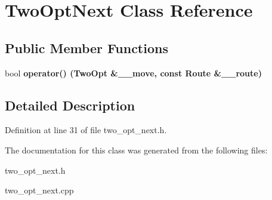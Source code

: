 \section{Two\-Opt\-Next Class Reference}
\label{class_two_opt_next}
\subsection*{Public Member Functions}
\begin{CompactItemize}
\item 
bool \bf{operator()} (\bf{Two\-Opt} \&\_\-\_\-move, const Route \&\_\-\_\-route)\label{class_two_opt_next_baf229b2e056f39ab971cf2ac66a833e}

\end{CompactItemize}


\subsection{Detailed Description}




Definition at line 31 of file two\_\-opt\_\-next.h.

The documentation for this class was generated from the following files:\begin{CompactItemize}
\item 
two\_\-opt\_\-next.h\item 
two\_\-opt\_\-next.cpp\end{CompactItemize}
